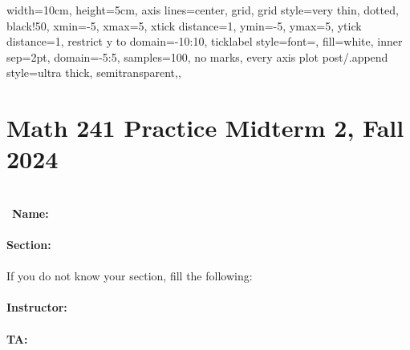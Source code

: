 \documentclass[11pt, addpoints]{exam}
\begin{document}
\pgfplotsset%
{
    width=10cm, height=5cm,
    axis lines=center, 
    grid,
    grid style={very thin, dotted, black!50},
    xmin=-5,    xmax=5,         xtick distance=1,
    ymin=-5,    ymax=5,         ytick distance=1,
    restrict y to domain=-10:10, %
    ticklabel style={font=\scriptsize, fill=white, inner sep=2pt},
    domain=-5:5, samples=100,
    no marks, 
    every axis plot post/.append style={ultra thick, semitransparent,},
}


\section*{Math 241 Practice Midterm 2, Fall 2024}
~\\
~\hspace{2mm}\textbf{Name:}\hspace{2mm}\underline{\hspace{7cm}}\\
~\\
\textbf{Section:}\underline{\hspace{1cm}}\\
~\\
If you do not know your section, fill the following:\\
~\\
\textbf{Instructor:}\underline{\hspace{7cm}}\\
~\\
\textbf{TA:}\underline{\hspace{85mm}}\\

\pagebreak
\end{document}
